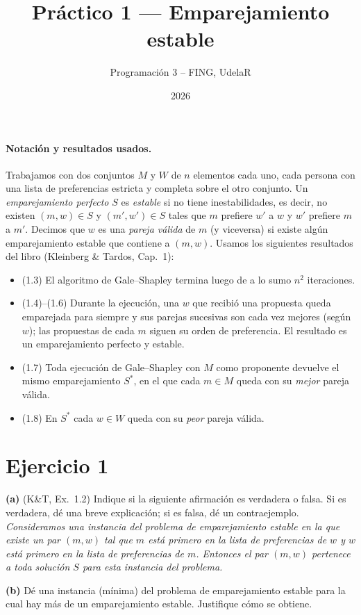 

\title{Práctico 1 --- Emparejamiento estable}
\author{Programación 3 -- FING, UdelaR}
\date{2026}


\maketitle

\paragraph{Notación y resultados usados.} Trabajamos con dos conjuntos $M$ y $W$ de $n$
elementos cada uno, cada persona con una lista de preferencias estricta y completa sobre el
otro conjunto. Un \emph{emparejamiento perfecto} $S$ es \emph{estable} si no tiene
inestabilidades, es decir, no existen $(m,w)\in S$ y $(m',w')\in S$ tales que $m$ prefiere
$w'$ a $w$ y $w'$ prefiere $m$ a $m'$. Decimos que $w$ es una \emph{pareja válida} de $m$
(y viceversa) si existe algún emparejamiento estable que contiene a $(m,w)$. Usamos los
siguientes resultados del libro (Kleinberg \& Tardos, Cap.~1):
\begin{itemize}
  \item (1.3) El algoritmo de Gale--Shapley termina luego de a lo sumo $n^2$ iteraciones.
  \item (1.4)--(1.6) Durante la ejecución, una $w$ que recibió una propuesta queda emparejada
        para siempre y sus parejas sucesivas son cada vez mejores (según $w$); las propuestas de
        cada $m$ siguen su orden de preferencia. El resultado es un emparejamiento perfecto y estable.
  \item (1.7) Toda ejecución de Gale--Shapley con $M$ como proponente devuelve el mismo
        emparejamiento $S^*$, en el que cada $m\in M$ queda con su \emph{mejor} pareja válida.
  \item (1.8) En $S^*$ cada $w\in W$ queda con su \emph{peor} pareja válida.
\end{itemize}

\section{Ejercicio 1}

\begin{enunciado}
\textbf{(a)} (K\&T, Ex.~1.2) Indique si la siguiente afirmación es verdadera o falsa. Si es
verdadera, dé una breve explicación; si es falsa, dé un contraejemplo.
\emph{Consideramos una instancia del problema de emparejamiento estable en la que existe un
par $(m,w)$ tal que $m$ está primero en la lista de preferencias de $w$ y $w$ está primero en
la lista de preferencias de $m$. Entonces el par $(m,w)$ pertenece a toda solución $S$ para
esta instancia del problema.}

\textbf{(b)} Dé una instancia (mínima) del problema de emparejamiento estable para la cual hay
más de un emparejamiento estable. Justifique cómo se obtiene.
\end{enunciado}

